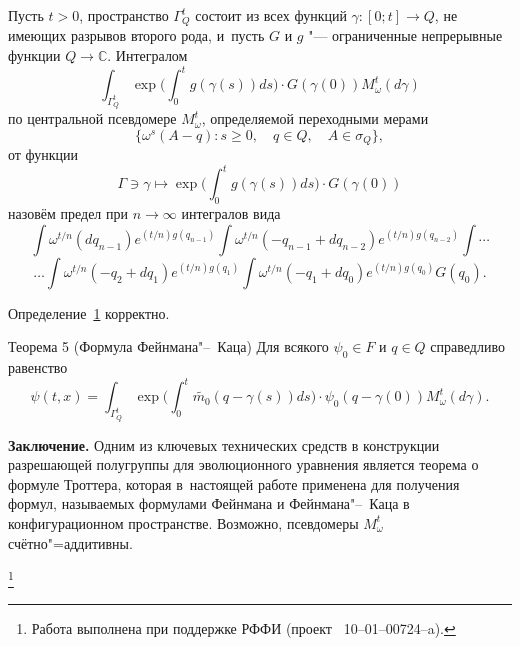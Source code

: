 \hypertarget{def:shamarov:i}{}

 \begin{definition}[1]Пусть $t>0$,  пространство $\Gamma^t_Q$ состоит из  всех функций \mbox{$\gamma:[0; t]\to Q $,}  не имеющих разрывов второго рода,
 и~пусть $G$ и $g$ "--- ограниченные непрерывные функции  $Q\to\mathbb C$.
 Интегралом $$\int_{\Gamma^t_Q} \exp\biggl({\int_0^t g(\gamma(s))ds}\biggr)\cdot G(\gamma(0)) M^t_\omega (d\gamma)$$ %
 по центральной псевдомере $M^t_\omega $,
 определяемой
 переходными мерами 
 $$\bigl\{\omega ^{s}{(A{-}q)}:s\geqslant 0,\quad q\in Q,\quad A\in \sigma _Q\bigr\},$$
 от функции 
 $$
 \Gamma\ni\gamma \mapsto \exp \biggl({\int_0^t g(\gamma(s))ds} \biggr) \cdot G(\gamma(0))
 $$
 назовём предел при $n\to\infty$  интегралов вида
  $$
 \int \omega ^{t/n }(d q_{n-1})e^{(t/n)g( q_{n-1})} 
 \int \omega ^{t/n }(-  q_{n-1}+d q_{n-2})e^{(t/n)g( q_{n-2})}
 \int
 \cdots
 $$
 $$
 \dots
 \int \omega ^{t/n }(-  q_{2}+d  q_{1})e^{(t/n)g( q_{1})}
 \int \omega ^{t/n }(- q_{1}+d q_{0})e^{(t/n)g(  q_{0})}
  G ( q_0).
  $$
   \end{definition}

\smallskip
   \begin{lemma}
  Определение~\hyperlink{def:shamarov:i}{\rm 1} корректно.
   \end{lemma}

\smallskip

   \begin{newthm}{Теорема 5 (Формула Фейнмана"--~Каца)}
  Для всякого $\psi_0\in F$ и $ q\in Q $
 справедливо равенство
 $$
 \psi(t,x)
 =
 \int_{\Gamma ^t_Q} \exp \biggl({\int_0^t \widetilde {m_0}(q-\gamma(s))ds}\biggr) \cdot \psi_0(q-\gamma(0))
 M^t_\omega (d\gamma).
 $$
   \end{newthm}


\smallskip



 {\bf Заключение.}   Одним из ключевых технических средств в конструкции
 разрешающей полугруппы для эволюционного уравнения
 является теорема о формуле Троттера, которая в~настоящей работе
 применена для получения  формул, называемых формулами Фейнмана и Фейнмана"--~Каца в
 конфигурационном пространстве. Возможно,  псевдомеры $M^t_\omega $ счётно"=аддитивны.



 \thanks{Работа выполнена при поддержке РФФИ (проект \No~10--01--00724--a).}

%


